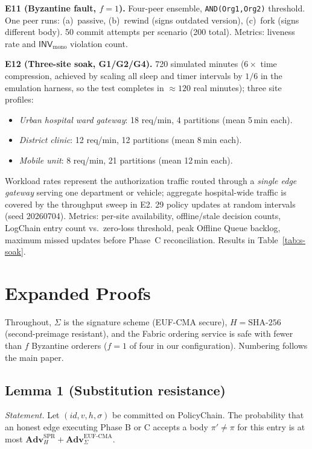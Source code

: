 \documentclass[runningheads]{llncs}
\begin{document}
\noindent\textbf{E11 (Byzantine fault, $f{=}1$).} Four-peer ensemble, \texttt{AND(Org1,Org2)} threshold. One peer runs: (a)~passive, (b)~rewind (signs outdated version), (c)~fork (signs different body). 50 commit attempts per scenario (200 total). Metrics: liveness rate and $\mathsf{INV}_{\mathrm{mono}}$ violation count.

\noindent\textbf{E12 (Three-site soak, G1/G2/G4).} 720 simulated minutes ($6\times$ time compression, achieved by scaling all sleep and timer intervals by $1/6$ in the emulation harness, so the test completes in $\approx120$ real minutes); three site profiles:
\begin{itemize}[leftmargin=*, itemsep=1pt]
  \item \emph{Urban hospital ward gateway}: 18 req/min, 4 partitions (mean 5\,min each).
  \item \emph{District clinic}: 12 req/min, 12 partitions (mean 8\,min each).
  \item \emph{Mobile unit}: 8 req/min, 21 partitions (mean 12\,min each).
\end{itemize}
Workload rates represent the authorization traffic routed through a \emph{single edge gateway} serving one department or vehicle; aggregate hospital-wide traffic is covered by the throughput sweep in E2.
29 policy updates at random intervals (seed 20260704). Metrics: per-site availability, offline/stale decision counts, LogChain entry count vs.\ zero-loss threshold, peak Offline Queue backlog, maximum missed updates before Phase~C reconciliation. Results in Table~\ref{tab:s-soak}.

\section{Expanded Proofs}
\label{s:proofs}

Throughout, $\Sigma$ is the signature scheme (EUF-CMA secure), $H=\mathrm{SHA\text{-}256}$ (second-preimage resistant), and the Fabric ordering service is safe with fewer than $f$ Byzantine orderers ($f{=}1$ of four in our configuration). Numbering follows the main paper.

\subsection*{Lemma 1 (Substitution resistance)}
\emph{Statement.} Let $(\mathit{id},v,h,\sigma)$ be committed on PolicyChain. The probability that an honest edge executing Phase B or C accepts a body $\pi'\neq\pi$ for this entry is at most $\mathbf{Adv}^{\mathrm{SPR}}_{H} + \mathbf{Adv}^{\mathrm{EUF\text{-}CMA}}_{\Sigma}$.
\end{document}
